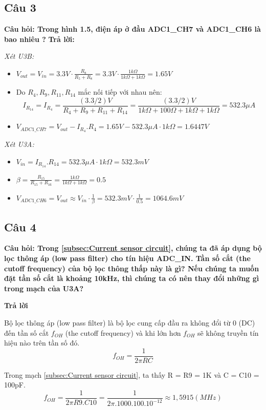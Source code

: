 \pagebreak
\subsection{Câu 3}
\textbf{Câu hỏi: Trong hình 1.5, điện áp ở đầu ADC1\_CH7 và ADC1\_CH6 là bao nhiêu ?}
\textbf{Trả lời:}

\textit{Xét U3B:}
\begin{itemize}
    \item $V_{out} = V_{in} = 3.3V \cdot \frac{R_8}{R_5 + R_8} = 3.3V \cdot \frac{1k\Omega}{1k\Omega + 1k\Omega} = 1.65V$
    \item Do $R_4, R_9, R_{11}, R_{14}$ mắc nối tiếp với nhau nên: \[I_{R_{14}} = I_{R_4} = \frac{(3.3 / 2) V}{R_4 + R_9 + R_{11} + R_{14}} = \frac{(3.3 / 2) V}{1k\Omega + 100\Omega + 1k\Omega + 1k\Omega} = 532.3 \mu A \]
    \item $V_{ADC1\_CH7} = V_{out} - I_{R_4}.R_4 = 1.65V  - 532.3 \mu A \cdot 1k\Omega = 1.6447V$
\end{itemize}
\textit{Xét U3A:}
\begin{itemize}
    \item $V_{in} = I_{R_{14}}.R_{14} = 532.3 \mu A \cdot 1k\Omega = 532.3mV$
    \item $\beta = \frac{R_{15}}{R_{15} + R_{16}} = \frac{1k\Omega}{1k\Omega + 1k\Omega} = 0.5$
    \item $V_{ADC1\_CH6} = V_{out} \approx V_{in} \cdot \frac{1}{\beta} = 532.3mV \cdot \frac{1}{0.5} = 1064.6mV$
\end{itemize}
\pagebreak
\subsection{Câu 4}
\textbf{Câu hỏi: Trong \ref{subsec:Current sensor circuit}, chúng ta đã áp dụng bộ lọc thông áp (low pass filter) cho tín hiệu ADC\_IN. Tần số cắt (the cutoff frequency) của bộ lọc thông thấp này là gì? Nếu chúng ta muốn đặt tần số cắt là khoảng 10kHz, thì
chúng ta có nên thay đổi những gì trong mạch của U3A?}

\textbf{Trả lời}

Bộ lọc thông áp (low pass filter) là bộ lọc cung cấp đầu ra không đổi từ 0 (DC) đến tần số cắt $f_{OH}$ (the cutoff frequency) và khi lớn hơn $f_{OH}$ sẽ
không truyền tín hiệu nào trên tần số đó.
\[f_{OH} = \dfrac{1}{2\pi RC}\]

Trong mạch \ref{subsec:Current sensor circuit}, ta thấy R = R9 = 1K và C = C10 = 100pF.
\[f_{OH} = \dfrac{1}{2\pi R9.C10} = \dfrac{1}{2\pi .1000.100.10^{-12}} \approx 1,5915 (MHz)\]


